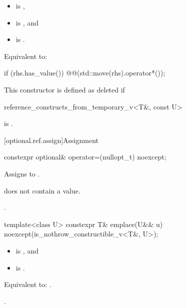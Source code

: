 \begin{itemdescr}
\pnum
\constraints
\begin{itemize}
\item {} is ,
\item {} is , and
\item {} is .
\end{itemize}

\pnum
\effects
Equivalent to:
\begin{codeblock}
if (rhs.has_value()) @@(std::move(rhs).operator*());
\end{codeblock}

\pnum
\remarks
This constructor is defined as deleted if
\begin{codeblock}
reference_constructs_from_temporary_v<T&, const U>
\end{codeblock}
is .
\end{itemdescr}

[optional.ref.assign]{Assignment}

\begin{itemdecl}
constexpr optional& operator=(nullopt_t) noexcept;
\end{itemdecl}

\begin{itemdescr}
\pnum
\effects
Assigns  to .

\pnum
\ensures
{} does not contain a value.

\pnum
\returns
{}.
\end{itemdescr}

\begin{itemdecl}
template<class U>
  constexpr T& emplace(U&& u) noexcept(is_nothrow_constructible_v<T&, U>);
\end{itemdecl}

\begin{itemdescr}
\pnum
\constraints
\begin{itemize}
\item {} is , and
\item {} is .
\end{itemize}

\pnum
\effects
Equivalent to: .

\pnum
\returns
{}.
\end{itemdescr}

